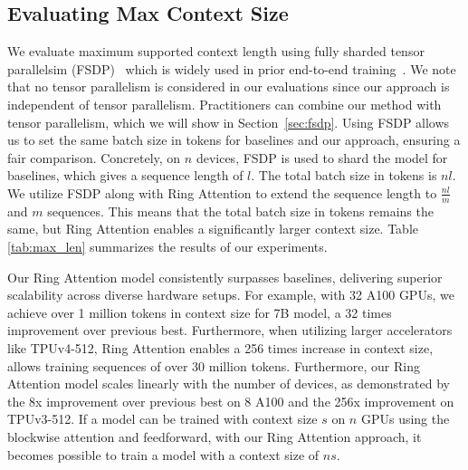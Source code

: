 \documentclass{article}
\newcommand{\ours}{{Ring Attention}\xspace}
\newcommand{\oursabb}{{Ring Attention}\xspace}
\begin{document}
\subsection{Evaluating Max Context Size}
\label{sec:max_context_size}
We evaluate maximum supported context length using fully sharded tensor parallelsim (FSDP)~\citep{fbFullySharded} which is widely used in prior end-to-end training~\citep{touvron2023llama,openllama2023}.
We note that no tensor parallelism is considered in our evaluations since our approach is independent of tensor parallelism.
Practitioners can combine our method with tensor parallelism, which we will show in Section~\ref{sec:fsdp}.
Using FSDP allows us to set the same batch size in tokens for baselines and our approach, ensuring a fair comparison.
Concretely, on $n$ devices, FSDP is used to shard the model for baselines, which gives a sequence length of $l$. The total batch size in tokens is $nl$. We utilize FSDP along with \ours to extend the sequence length to $\frac{nl}{m}$ and $m$ sequences. This means that the total batch size in tokens remains the same, but \ours enables a significantly larger context size.
Table \ref{tab:max_len} summarizes the results of our experiments.

Our \oursabb model consistently surpasses baselines, delivering superior scalability across diverse hardware setups. For example, with 32 A100 GPUs, we achieve over 1 million tokens in context size for 7B model, a 32 times improvement over previous best.
Furthermore, when utilizing larger accelerators like TPUv4-512, \oursabb enables a 256 times increase in context size, allows training sequences of over 30 million tokens.
Furthermore, our \oursabb model scales linearly with the number of devices, as demonstrated by the 8x improvement over previous best on 8 A100 and the 256x improvement on TPUv3-512.
If a model can be trained with context size $s$ on $n$ GPUs using the blockwise attention and feedforward, with our \oursabb approach, it becomes possible to train a model with a context size of $ns$.
\end{document}
